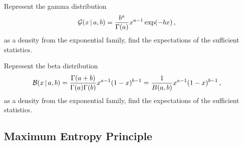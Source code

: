 \begin{exercise}
    Represent the gamma distribution
    \begin{align}
        \mathcal{G}(x\,|\, a,b) = \frac{b^a}{\Gamma(a)}x^{a-1}\exp(-b x)\,,
    \end{align}
    as a density from the exponential family, find the expectations of the sufficient statistics.
\end{exercise}

\begin{exercise}
    Represent the beta distribution
    \begin{align}
        \mathcal{B}(x\,|\, a,b) = \frac{\Gamma(a+b)}{\Gamma(a)\Gamma(b)}x^{a-1}(1-x)^{b-1} = \frac{1}{B(a,b)}x^{a-1}(1-x)^{b-1}\,,
    \end{align}
    as a density from the exponential family, find the expectations of the sufficient statistics.
\end{exercise}

\subsection{Maximum Entropy Principle \citep{jaynes1957information}}

